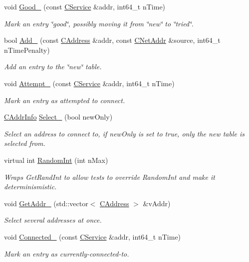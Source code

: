 \begin{DoxyCompactItemize}
void \mbox{\hyperlink{class_c_addr_man_a33ec6a4584cf4b17af821e6e35216459}{Good\+\_\+}} (const \mbox{\hyperlink{class_c_service}{C\+Service}} \&addr, int64\+\_\+t n\+Time)
\begin{DoxyCompactList}\small\item\em Mark an entry \char`\"{}good\char`\"{}, possibly moving it from \char`\"{}new\char`\"{} to \char`\"{}tried\char`\"{}. \end{DoxyCompactList}\item 
bool \mbox{\hyperlink{class_c_addr_man_a9dd6df8b1904548a86054d19d4a90724}{Add\+\_\+}} (const \mbox{\hyperlink{class_c_address}{C\+Address}} \&addr, const \mbox{\hyperlink{class_c_net_addr}{C\+Net\+Addr}} \&source, int64\+\_\+t n\+Time\+Penalty)
\begin{DoxyCompactList}\small\item\em Add an entry to the \char`\"{}new\char`\"{} table. \end{DoxyCompactList}\item 
void \mbox{\hyperlink{class_c_addr_man_ab1a1bfa8b435ef139570c88de1a5245f}{Attempt\+\_\+}} (const \mbox{\hyperlink{class_c_service}{C\+Service}} \&addr, int64\+\_\+t n\+Time)
\begin{DoxyCompactList}\small\item\em Mark an entry as attempted to connect. \end{DoxyCompactList}\item 
\mbox{\hyperlink{class_c_addr_info}{C\+Addr\+Info}} \mbox{\hyperlink{class_c_addr_man_a27e51ef4fe86db1ff5a5e45caefc1ef4}{Select\+\_\+}} (bool new\+Only)
\begin{DoxyCompactList}\small\item\em Select an address to connect to, if new\+Only is set to true, only the new table is selected from. \end{DoxyCompactList}\item 
virtual int \mbox{\hyperlink{class_c_addr_man_a4bf12611bd89c5e524396e50bf8f3846}{Random\+Int}} (int n\+Max)
\begin{DoxyCompactList}\small\item\em Wraps Get\+Rand\+Int to allow tests to override Random\+Int and make it determinismistic. \end{DoxyCompactList}\item 
void \mbox{\hyperlink{class_c_addr_man_aff86d04dc7c0e0afae3ff5998417db17}{Get\+Addr\+\_\+}} (std\+::vector$<$ \mbox{\hyperlink{class_c_address}{C\+Address}} $>$ \&v\+Addr)
\begin{DoxyCompactList}\small\item\em Select several addresses at once. \end{DoxyCompactList}\item 
void \mbox{\hyperlink{class_c_addr_man_a1ae72643c51293f3f3345e74ce0368ca}{Connected\+\_\+}} (const \mbox{\hyperlink{class_c_service}{C\+Service}} \&addr, int64\+\_\+t n\+Time)
\begin{DoxyCompactList}\small\item\em Mark an entry as currently-\/connected-\/to. \end{DoxyCompactList}\end{DoxyCompactItemize}
